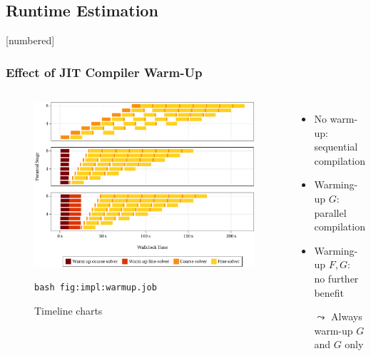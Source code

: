 \subsection{Runtime Estimation}

\begin{frame}[fragile]
  [numbered]
  \frametitle{Effect of JIT Compiler Warm-Up}
  \begin{columns}
    \begin{figure}
    \includegraphics[width=\textwidth]{figures/fig_impl_warmup1.pdf}%
    \renewcommand\thefigure{7.1} %
    \caption{Timeline charts}
    \lstinline!bash fig:impl:warmup.job!
    \end{figure}
    \begin{itemize}
      \item
        No warm-up:\\ sequential compilation
        \vspace{2em}
      \item
        Warming-up $G$:\\ parallel compilation
        \vspace{2em}
      \item
        Warming-up $F,G$:\\ no further benefit
        \vspace{2em}
      \pause
      \item[$\leadsto$]
        Always warm-up $G$\\ and $G$ only
    \end{itemize}
    \vspace{2em}
  \end{columns}
\end{frame}

